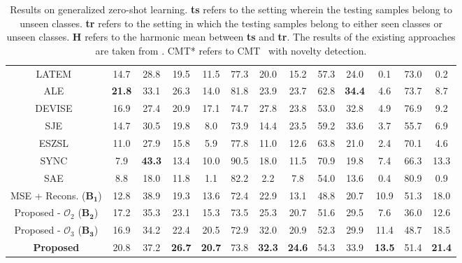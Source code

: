 \documentclass[10pt,twocolumn,letterpaper]{article}
\begin{document}
\begin{table*}[t!]
\begin{tabular}{|c|c|c|c|c|c|c|c|c|c|c|c|c|}
		LATEM~\cite{xian2016latent}             & 14.7          & 28.8          & 19.5          & 11.5          & 77.3          & 20.0          & 15.2          & 57.3          & 24.0          & 0.1           & 73.0 & 0.2           \\
		ALE~\cite{akata2016label}                & \textbf{21.8} & 33.1          & 26.3          & 14.0          & 81.8          & 23.9          & 23.7          & 62.8          & \textbf{34.4} & 4.6           & 73.7 & 8.7           \\
		DEVISE~\cite{frome2013devise}            & 16.9          & 27.4          & 20.9          & 17.1          & 74.7          & 27.8          & 23.8          & 53.0          & 32.8          & 4.9           & 76.9 & 9.2           \\
		SJE~\cite{akata2015evaluation}               & 14.7          & 30.5          & 19.8          & 8.0           & 73.9          & 14.4          & 23.5          & 59.2          & 33.6          & 3.7           & 55.7 & 6.9           \\
		ESZSL~\cite{romera2015embarrassingly}             & 11.0          & 27.9          & 15.8          & 5.9           & 77.8          & 11.0          & 12.6          & 63.8          & 21.0          & 2.4           & 70.1 & 4.6           \\
		SYNC~\cite{changpinyo2016synthesized}              & 7.9           & \textbf{43.3}          & 13.4          & 10.0          & 90.5          & 18.0          & 11.5          & 70.9          & 19.8          & 7.4           & 66.3 & 13.3          \\
		SAE~\cite{Kodirov_2017_CVPR}               & 8.8           & 18.0          & 11.8          & 1.1           & 82.2          & 2.2           & 7.8           & 54.0          & 13.6          & 0.4           & 80.9 & 0.9           \\ \hline
		MSE + Recons. ($\mathbf{B_1}$)& 12.8          & 38.9          &  19.3 & 13.6 & 72.4          & 22.9 & 13.1 & 48.8          & 20.7        & 10.9 & 51.3 & 18.0 \\
		Proposed - $\mathcal{O}_2$ ($\mathbf{B_2}$)&17.2 &35.3 &23.1 &15.3  &73.5 &25.3 &20.7 &51.6 &29.5 &7.6 &36.0 &12.6\\ 
		Proposed - $\mathcal{O}_3$ ($\mathbf{B_3}$)&16.9 &34.2 &22.4 &20.5  &72.9 &32.0 &20.9 &52.3 &29.9 &11.4 &48.7 &18.5\\ \hline
		\textbf{Proposed} & 20.8          & 37.2          & \textbf{26.7} & \textbf{20.7} & 73.8          & \textbf{32.3} & \textbf{24.6} & 54.3          & 33.9          & \textbf{13.5} & 51.4 & \textbf{21.4} \\ \hline
	\end{tabular}
	\caption{\small Results on generalized zero-shot learning. \textbf{ts} refers to the setting wherein the testing samples belong to unseen classes. \textbf{tr} refers to the setting in which the testing samples belong to either seen classes or unseen classes. \textbf{H} refers to the harmonic mean between \textbf{ts} and \textbf{tr}. The results of the existing approaches are taken from \cite{xian2017zero1}. CMT* refers to CMT~\cite{socher2013zero} with novelty detection.}
	\label{gen-zsl-results}
\end{table*}
\end{document}
